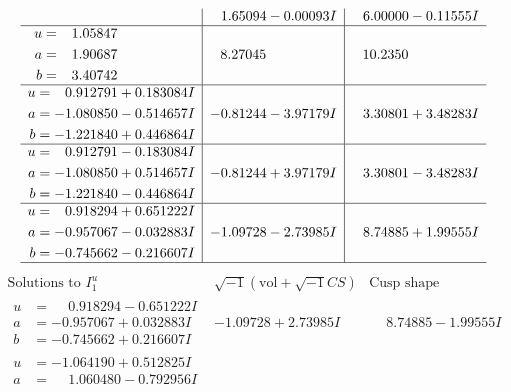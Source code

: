 \documentclass[1p]{elsarticle_modified}
\theoremstyle{definition}
\newcommand{\I}{\sqrt{-1}}
\begin{document}
$$\begin{array}{c|c|c}
 & \phantom{-}1.65094 - 0.00093 I & \phantom{-}6.00000 - 0.11555 I \\ \hline\begin{aligned}
u &= \phantom{-}1.05847\phantom{ +0.000000I} \\
a &= \phantom{-}1.90687\phantom{ +0.000000I} \\
b &= \phantom{-}3.40742\phantom{ +0.000000I}\end{aligned}
 & \phantom{-}8.27045\phantom{ +0.000000I} & \phantom{-}10.2350\phantom{ +0.000000I} \\ \hline\begin{aligned}
u &= \phantom{-}0.912791 + 0.183084 I \\
a &= -1.080850 - 0.514657 I \\
b &= -1.221840 + 0.446864 I\end{aligned}
 & -0.81244 - 3.97179 I & \phantom{-}3.30801 + 3.48283 I \\ \hline\begin{aligned}
u &= \phantom{-}0.912791 - 0.183084 I \\
a &= -1.080850 + 0.514657 I \\
b &= -1.221840 - 0.446864 I\end{aligned}
 & -0.81244 + 3.97179 I & \phantom{-}3.30801 - 3.48283 I \\ \hline\begin{aligned}
u &= \phantom{-}0.918294 + 0.651222 I \\
a &= -0.957067 - 0.032883 I \\
b &= -0.745662 - 0.216607 I\end{aligned}
 & -1.09728 - 2.73985 I & \phantom{-}8.74885 + 1.99555 I\\
 \hline 
 \end{array}$$\newpage$$\begin{array}{c|c|c}  
\text{Solutions to }I^u_{1}& \I (\text{vol} + \sqrt{-1}CS) & \text{Cusp shape}\\
 \hline 
\begin{aligned}
u &= \phantom{-}0.918294 - 0.651222 I \\
a &= -0.957067 + 0.032883 I \\
b &= -0.745662 + 0.216607 I\end{aligned}
 & -1.09728 + 2.73985 I & \phantom{-}8.74885 - 1.99555 I \\ \hline\begin{aligned}
u &= -1.064190 + 0.512825 I \\
a &= \phantom{-}1.060480 - 0.792956 I \\

\end{aligned}
\end{array}$$
\end{document}
